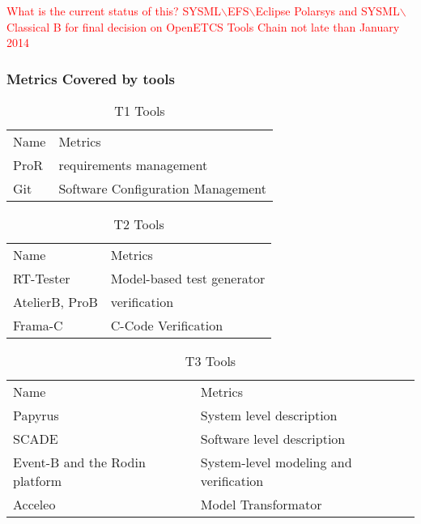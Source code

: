 \documentclass{template/openetcs_article}
\begin{document}
\textcolor{red}{What is the current status of this? SYSML$\backslash$EFS$\backslash$Eclipse Polarsys and SYSML$\backslash$Classical B for final decision on OpenETCS Tools Chain not late than January 2014}

\subsubsection{Metrics Covered by tools}

\begin{table}[H]
\begin{tabular}{|m{3cm}|m{10cm}|}
\hline
\rowcolor{myblue}
\multicolumn{2}{|c|}{T1 Tools} \\\hline
\rowcolor{lightgray}
Name &
Metrics 
\\\hline
ProR & requirements management\\\hline
Git & Software Configuration Management\\\hline
\end{tabular}
\caption{T1 Tools}
\end{table}

\begin{table}[H]
\begin{tabular}{|m{3cm}|m{10cm}|}
\hline
\rowcolor{myblue}
\multicolumn{2}{|c|}{T2 Tools} \\\hline
\rowcolor{lightgray}
Name &
Metrics 
\\\hline
RT-Tester& Model-based test generator\\\hline
AtelierB, ProB & verification\\\hline
Frama-C & C-Code Verification\\\hline
\end{tabular}
\caption{T2 Tools}
\end{table}

\begin{table}[H]
\begin{tabular}{|m{3cm}|m{10cm}|}
\hline
\rowcolor{myblue}
\multicolumn{2}{|c|}{T3 Tools} \\\hline
\rowcolor{lightgray}
Name &
Metrics 
\\\hline
Papyrus & System level description\\\hline
SCADE & Software level description\\\hline
Event-B and the Rodin platform & System-level modeling and
verification\\\hline

Acceleo & Model Transformator\\\hline
\end{tabular}
\caption{T3 Tools}
\end{table}
\end{document}
